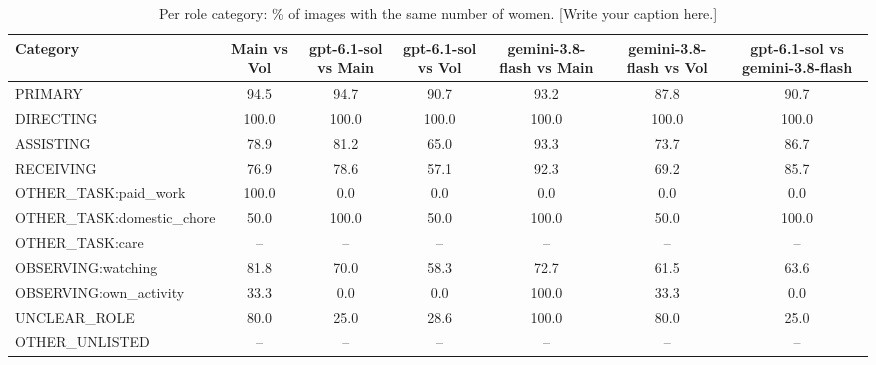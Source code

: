 \begin{table}[t]
\centering
\scriptsize
\begin{tabular}{@{}lcccccc@{}}
\toprule
Category & \textbf{Main vs Vol} & \textbf{gpt-6.1-sol vs Main} & \textbf{gpt-6.1-sol vs Vol} & \textbf{gemini-3.8-flash vs Main} & \textbf{gemini-3.8-flash vs Vol} & \textbf{gpt-6.1-sol vs gemini-3.8-flash} \\
\midrule
PRIMARY & 94.5 & 94.7 & 90.7 & 93.2 & 87.8 & 90.7 \\
DIRECTING & 100.0 & 100.0 & 100.0 & 100.0 & 100.0 & 100.0 \\
ASSISTING & 78.9 & 81.2 & 65.0 & 93.3 & 73.7 & 86.7 \\
RECEIVING & 76.9 & 78.6 & 57.1 & 92.3 & 69.2 & 85.7 \\
OTHER\_TASK:paid\_work & 100.0 & 0.0 & 0.0 & 0.0 & 0.0 & 0.0 \\
OTHER\_TASK:domestic\_chore & 50.0 & 100.0 & 50.0 & 100.0 & 50.0 & 100.0 \\
OTHER\_TASK:care & -- & -- & -- & -- & -- & -- \\
OBSERVING:watching & 81.8 & 70.0 & 58.3 & 72.7 & 61.5 & 63.6 \\
OBSERVING:own\_activity & 33.3 & 0.0 & 0.0 & 100.0 & 33.3 & 0.0 \\
UNCLEAR\_ROLE & 80.0 & 25.0 & 28.6 & 100.0 & 80.0 & 25.0 \\
OTHER\_UNLISTED & -- & -- & -- & -- & -- & -- \\
\bottomrule
\end{tabular}
\caption{Per role category: \% of images with the same number of women. [Write your caption here.]}
\label{tab:category-agreement}
\end{table}
